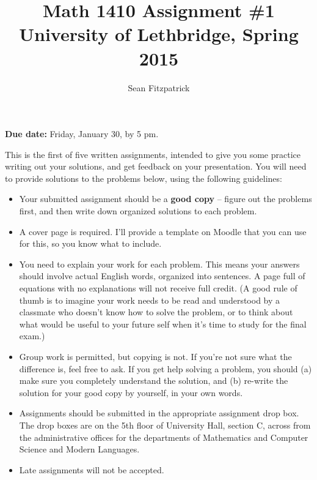 \documentclass[letterpaper,12pt]{article}
\title{Math 1410 Assignment \#1\\University of Lethbridge, Spring 2015}
\author{Sean Fitzpatrick}
\begin{document}
 \maketitle

{\bf Due date:} Friday, January 30, by 5 pm.

\bigskip

This is the first of five written assignments, intended to give you some practice writing out your solutions, and get feedback on your presentation. You will need to provide solutions to the problems below, using the following guidelines:
\begin{itemize}
\item Your submitted assignment should be a {\bf good copy} -- figure out the problems first, and then write down organized solutions to each problem. 
\item A cover page is required. I'll provide a template on Moodle that you can use for this, so you know what to include.
\item You need to explain your work for each problem. This means your answers should involve actual English words, organized into sentences. A page full of equations with no explanations will not receive full credit. (A good rule of thumb is to imagine your work needs to be read and understood by a classmate who doesn't know how to solve the problem, or to think about what would be useful to your future self when it's time to study for the final exam.)
\item Group work is permitted, but copying is not. If you're not sure what the difference is, feel free to ask. If you get help solving a problem, you should (a) make sure you completely understand the solution, and (b) re-write the solution for your good copy by yourself, in your own words.
\item Assignments should be submitted in the appropriate assignment drop box. The drop boxes are on the 5th floor of University Hall, section C, across from the administrative offices for the departments of Mathematics and Computer Science and Modern Languages. 
\item Late assignments will not be accepted.

\end{itemize}
\newpage
\end{document}
